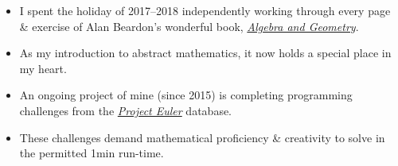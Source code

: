 \begin{itemize}
\item I spent the holiday of 2017--2018 independently working through every page \& exercise of Alan Beardon's wonderful book,
    \href{https://www.cambridge.org/za/universitypress/subjects/mathematics/algebra/algebra-and-geometry}{\emph{Algebra and Geometry}}.
\item As my introduction to abstract mathematics, it now holds a special place in my heart.
\end{itemize}
\smallskip

\begin{itemize}
\item An ongoing project of mine (since 2015) is completing programming challenges from the \href{https://projecteuler.net/about}{\emph{Project Euler}} database.
\item These challenges demand mathematical proficiency \& creativity to solve in the permitted 1min run-time.
\end{itemize}
\smallskip




